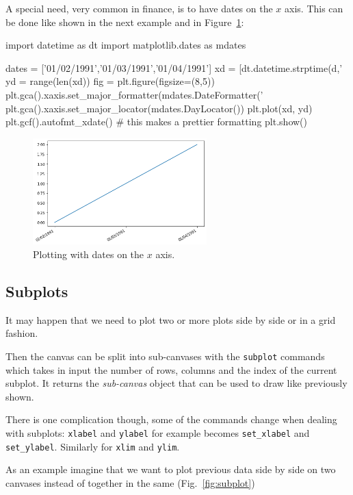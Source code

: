 A special need, very common in finance, is to have dates on the $x$ axis. This can be done like shown in the next example and in Figure~\ref{fig:axis3}:

\begin{ipythonnon}
import datetime as dt
import matplotlib.dates as mdates

dates = ['01/02/1991','01/03/1991','01/04/1991']
xd = [dt.datetime.strptime(d,'%
yd = range(len(xd))
fig = plt.figure(figsize=(8,5))
plt.gca().xaxis.set_major_formatter(mdates.DateFormatter('%
plt.gca().xaxis.set_major_locator(mdates.DayLocator())
plt.plot(xd, yd)
plt.gcf().autofmt_xdate() # this makes a prettier formatting
plt.show()
\end{ipythonnon}

\begin{figure}[ht]
	\centering
	\includegraphics[width=0.6\textwidth]{figures/axis3}
	\caption{Plotting with dates on the $x$ axis.}
	\label{fig:axis3}
\end{figure}

\subsection{Subplots}
\label{subplots}

It may happen that we need to plot two or more plots side by side or in a grid fashion.

Then the canvas can be split into sub-canvases with the  \texttt{subplot} commands which takes in input the number of rows, columns and the index of the current subplot. It returns the \emph{sub-canvas} object that can be used to draw like previously shown.

There is one complication though, some of the commands change when
dealing with subplots: \texttt{xlabel} and \texttt{ylabel} for example becomes \texttt{set\_xlabel} and \texttt{set\_ylabel}. Similarly for \texttt{xlim} and \texttt{ylim}.

As an example imagine that we want to plot previous data side by side on two canvases instead of together in the same (Fig.~\ref{fig:subplot})

